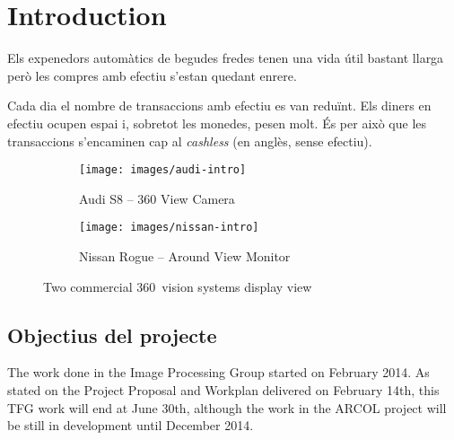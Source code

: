 \chapter{Introduction}

Els expenedors automàtics de begudes fredes tenen una vida útil bastant llarga però les compres amb efectiu s'estan quedant enrere.

Cada dia el nombre de transaccions amb efectiu es van reduïnt. Els diners en efectiu ocupen espai i, sobretot les monedes, pesen molt. És per això que les transaccions s'encaminen cap al \textit{cashless} (en anglès, sense efectiu).


\begin{figure}
	\centering
	\begin{subfigure}[b]{0.45\textwidth}
		\texttt{[image: images/audi-intro]}
		\caption{Audi S8 -- 360 View Camera}
		\label{fig:audi-intro-example}
	\end{subfigure}
	\hspace{0.5cm}
	\begin{subfigure}[b]{0.45\textwidth}
		\texttt{[image: images/nissan-intro]}
		\caption{Nissan Rogue -- Around View Monitor}
		\label{fig:nissan-intro-example}
	\end{subfigure}
	\caption{Two commercial 360\degree~vision systems display view}
	\label{fig:intro-example}
\end{figure}

\section{Objectius del projecte}
The work done in the Image Processing Group started on February 2014. As stated on the Project Proposal and Workplan delivered on February 14th, this TFG work will end at June 30th, although the work in the ARCOL project will be still in development until December 2014.

